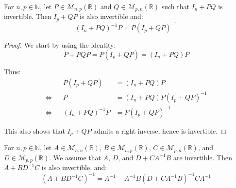 \begin{proposition}\label{th:push_through}
	For $n,p\in\mathbb{N}$, let $P\in\mathcal{M}_{n,p}(\mathbb{R})$ and $Q\in\mathcal{M}_{p,n}(\mathbb{R})$ such that $I_n+PQ$ is invertible. Then $I_p+QP$ is also invertible and:
	\begin{equation}
		(I_n+PQ)^{-1}P=P(I_p+QP)^{-1}
	\end{equation}
\end{proposition}

\begin{proof}
	We start by using the identity:
	\begin{equation}
		P+PQP=P(I_p+QP)=(I_n+PQ)P
	\end{equation}

	Thus:
	\begin{equation}
		\begin{aligned}
		&&P(I_p+QP)&=(I_n+PQ)P\\
		\iff&&P&=(I_n+PQ)P(I_p+QP)^{-1}\\
		\iff&&(I_n+PQ)^{-1}P&=P(I_p+QP)^{-1}
		\end{aligned}
	\end{equation}

	This also shows that $I_p+QP$ admits a right inverse, hence is invertible.
\end{proof}

\begin{proposition}\label{th:Woodbury}
	For $n,p\in\mathbb{N}$, let $A\in\mathcal{M}_{n,n}(\mathbb{R})$, $B\in\mathcal{M}_{n,p}(\mathbb{R})$, $C\in\mathcal{M}_{p,n}(\mathbb{R})$, and $D\in\mathcal{M}_{p,p}(\mathbb{R})$. We assume that $A$, $D$, and $D+CA^{-1}B$ are invertible. Then $A+BD^{-1}C$ is also invertible, and:
	\begin{equation}
		\left(A+BD^{-1}C\right)^{-1}=A^{-1}-A^{-1}B\left(D+CA^{-1}B\right)^{-1}CA^{-1}
	\end{equation}
\end{proposition}

